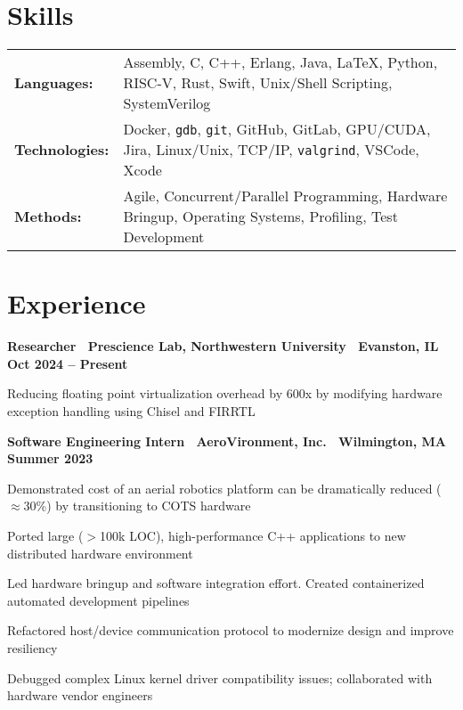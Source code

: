 \documentclass[10pt]{article}
\newenvironment{mylist}[1][]
{\itemize[nosep, wide=0pt, leftmargin=*, after=\strut]}
{\enditemize}
\begin{document}
\section{Skills}
\begin{tabularx}{\linewidth}{@{}l X@{}}
    \textbf{Languages:} & Assembly, C, C++, Erlang, Java, \LaTeX, Python, RISC-V, Rust, Swift, Unix/Shell Scripting, SystemVerilog \\
    \textbf{Technologies:} & Docker, \texttt{gdb}, \texttt{git}, GitHub, GitLab, GPU/CUDA, Jira, Linux/Unix, TCP/IP, \texttt{valgrind}, VSCode, Xcode \\
    \textbf{Methods:} & Agile, Concurrent/Parallel Programming, Hardware Bringup, Operating Systems, Profiling, Test Development
\end{tabularx}


\section{Experience}
\begin{minipage}[t]{\linewidth}
    \textbf{Researcher \textbar \ Prescience Lab, Northwestern University \textbar \ Evanston, IL} \hfill \textbf{Oct 2024 -- Present} 
    \begin{mylist}
        \item Reducing floating point virtualization overhead by 600x by modifying hardware exception handling using Chisel and FIRRTL
    \end{mylist}
\end{minipage}

\begin{minipage}[t]{\linewidth}
    \textbf{Software Engineering Intern \textbar \ AeroVironment, Inc. \textbar \ Wilmington, MA} \hfill \textbf{Summer 2023} 
    \begin{mylist}
        \item Demonstrated cost of an aerial robotics platform can be dramatically reduced ($\approx$30\%) by transitioning to COTS hardware
        \item Ported large ($>$100k LOC), high-performance C++ applications to new distributed hardware environment
        \item Led hardware bringup and software integration effort. Created containerized automated development pipelines
        \item Refactored host/device communication protocol to modernize design and improve resiliency
        \item Debugged complex Linux kernel driver compatibility issues; collaborated with hardware vendor engineers
    \end{mylist}
\end{minipage}
\end{document}
